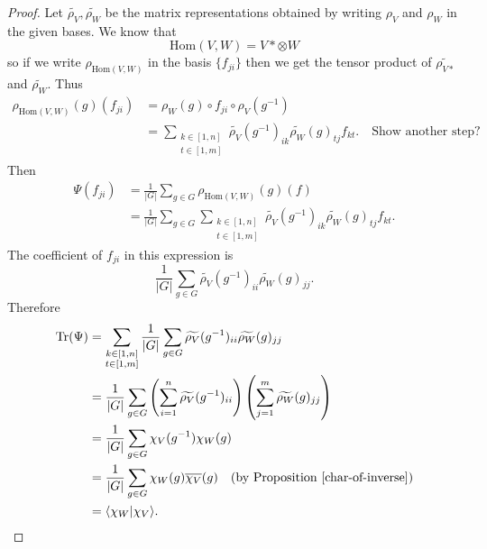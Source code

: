 \begin{proof}
Let $\widetilde{\rho_V}, \widetilde{\rho_W}$ be the matrix representations obtained by writing $\rho_V$ and $\rho_W$ in the given bases.  We know that 
\[ \text{Hom}(V,W) = V* \otimes W \]
so if we write $\rho_{\text{Hom}(V,W)}$ in the basis $\{ f_{ji} \}$ then we get the tensor product of  $\widetilde{\rho_{V*}}$ and $\widetilde{\rho_W}$.  Thus
\begin{align*}
\rho_{\text{Hom}(V,W)}(g)(f_{ji}) &= \rho_W (g) \circ f_{ji} \circ \rho_V (g^{-1}) \\
&= \sum_{\substack{k \in [1,n] \\  t \in [1,m]}} \widetilde{\rho_V} (g^{-1})_{ik} \widetilde{\rho_W}(g)_{tj} f_{kt}. \quad \text{Show another step?}
\end{align*}
Then 
\begin{align*}
\Psi (f_{ji}) &= \frac{1}{|G|} \sum_{g \in G} \rho_{\text{Hom}(V,W)}(g)(f) \\
&= \frac{1}{|G|} \sum_{g \in G} \sum_{\substack{k \in [1,n] \\  t \in [1,m]}} \widetilde{\rho_V} (g^{-1})_{ik} \widetilde{\rho_W}(g)_{tj} f_{kt}.
\end{align*}
The coefficient of $f_{ji}$ in this expression is
\[ \frac{1}{|G|} \sum_{g \in G}\widetilde{\rho_V} (g^{-1})_{ii} \widetilde{\rho_W}(g)_{jj}. \]
Therefore
\begin{align*}
\text{Tr} (\Psi) &= \sum_{\substack{k \in [1,n] \\  t \in [1,m]}}  \frac{1}{|G|} \sum_{g \in G}\widetilde{\rho_V} (g^{-1})_{ii} \widetilde{\rho_W}(g)_{jj} \\
&=  \frac{1}{|G|} \sum_{g \in G} \left( \sum_{i=1}^n \widetilde{\rho_V}(g^{-1})_{ii} \right) \left( \sum_{j=1}^m \widetilde{\rho_W} (g)_{jj} \right) \\
&= \frac{1}{|G|} \sum_{g \in G} \chi_V (g^{-1}) \chi_W (g) \\
&= \frac{1}{|G|} \sum_{g \in G} \chi_W (g) \overline{\chi_V}(g)  \quad \text{(by Proposition \ref{char-of-inverse})}\\
&= \langle \chi_W | \chi_V \rangle.
\end{align*}
\end{proof}

